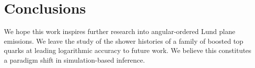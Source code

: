 \section{Conclusions}\label{sec:conclusions}

We hope this work inspires further research into angular-ordered Lund
plane emissions. We leave the study of the shower histories of a family
of boosted top quarks at leading logarithmic accuracy to future work. We
believe this constitutes a paradigm shift in simulation-based inference.

